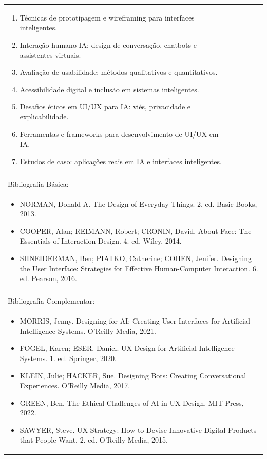 \documentclass[11pt]{article}
\begin{document}
\begin{center}
\begin{longtable}{|p{4cm}|p{4cm}|p{4cm}|p{4cm}|}
{\begin{enumerate}
\item Técnicas de prototipagem e wireframing para interfaces inteligentes.
\item Interação humano-IA: design de conversação, chatbots e assistentes virtuais.
\item Avaliação de usabilidade: métodos qualitativos e quantitativos.
\item Acessibilidade digital e inclusão em sistemas inteligentes.
\item Desafios éticos em UI/UX para IA: viés, privacidade e explicabilidade.
\item Ferramentas e frameworks para desenvolvimento de UI/UX em IA.
\item Estudos de caso: aplicações reais em IA e interfaces inteligentes.\end{enumerate}}\\
\multicolumn{4}{|p{16cm}|}{}\\
\hline
\multicolumn{4}{|p{16cm}|}{Bibliografia Básica:}\\
\multicolumn{4}{|p{16cm}|}{%
\begin{itemize}\item NORMAN, Donald A. The Design of Everyday Things. 2. ed. Basic Books, 2013.
\item COOPER, Alan; REIMANN, Robert; CRONIN, David. About Face: The Essentials of Interaction Design. 4. ed. Wiley, 2014.
\item SHNEIDERMAN, Ben; PIATKO, Catherine; COHEN, Jenifer. Designing the User Interface: Strategies for Effective Human-Computer Interaction. 6. ed. Pearson, 2016.\end{itemize}}\\
\multicolumn{4}{|p{16cm}|}{}\\
\hline
\multicolumn{4}{|p{16cm}|}{Bibliografia Complementar:}\\
\multicolumn{4}{|p{16cm}|}{%
\begin{itemize}\item MORRIS, Jenny. Designing for AI: Creating User Interfaces for Artificial Intelligence Systems. O'Reilly Media, 2021.
\item FOGEL, Karen; ESER, Daniel. UX Design for Artificial Intelligence Systems. 1. ed. Springer, 2020.
\item KLEIN, Julie; HACKER, Sue. Designing Bots: Creating Conversational Experiences. O'Reilly Media, 2017.
\item GREEN, Ben. The Ethical Challenges of AI in UX Design. MIT Press, 2022.
\item SAWYER, Steve. UX Strategy: How to Devise Innovative Digital Products that People Want. 2. ed. O'Reilly Media, 2015.\end{itemize}}\\
\hline
\end{longtable}
\end{center}
\end{document}
